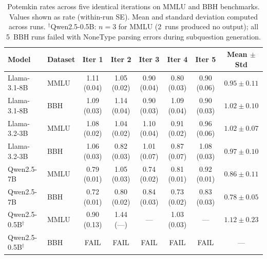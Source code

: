 \documentclass[sigconf,authordraft]{acmart}
\begin{document}
\begin{table}[t]
\centering
\small
\setlength{\tabcolsep}{5pt}
\renewcommand{\arraystretch}{1.2}

\begin{tabular}{ll ccccc c}
\toprule
\textbf{Model} & \textbf{Dataset} & \textbf{Iter 1} & \textbf{Iter 2} & \textbf{Iter 3} & \textbf{Iter 4} & \textbf{Iter 5} & \textbf{Mean $\pm$ Std} \\
\midrule

Llama-3.1-8B & MMLU
& 1.11 (0.04) & 1.05 (0.02) & 0.90 (0.04) & 0.80 (0.03) & 0.90 (0.06) & $0.95 \pm 0.11$ \\

Llama-3.1-8B & BBH
& 1.09 (0.03) & 1.14 (0.04) & 0.90 (0.03) & 1.09 (0.04) & 0.90 (0.03) & $1.02 \pm 0.10$ \\

\rowcolor{gray!10}
Llama-3.2-3B & MMLU
& 1.08 (0.02) & 1.04 (0.02) & 1.10 (0.04) & 0.91 (0.02) & 0.96 (0.06) & $1.02 \pm 0.07$ \\

\rowcolor{gray!10}
Llama-3.2-3B & BBH
& 1.06 (0.03) & 0.82 (0.03) & 1.01 (0.07) & 0.87 (0.07) & 1.08 (0.03) & $0.97 \pm 0.10$ \\

Qwen2.5-7B & MMLU
& 0.79 (0.01) & 1.05 (0.03) & 0.74 (0.02) & 0.81 (0.01) & 0.92 (0.01) & $0.86 \pm 0.11$ \\

Qwen2.5-7B & BBH
& 0.72 (0.01) & 0.80 (0.02) & 0.84 (0.03) & 0.73 (0.02) & 0.83 (0.03) & $0.78 \pm 0.05$ \\

\rowcolor{gray!10}
Qwen2.5-0.5B$^\dagger$ & MMLU
& 0.90 (0.13) & 1.44 (---) & --- & 1.03 (0.03) & --- & $1.12 \pm 0.23$ \\

\rowcolor{gray!10}
Qwen2.5-0.5B$^\dagger$ & BBH
& FAIL & FAIL & FAIL & FAIL & FAIL & --- \\

\bottomrule
\end{tabular}

\caption{Potemkin rates across five identical iterations on MMLU and BBH benchmarks. Values shown as rate (within-run SE). Mean and standard deviation computed across runs. $^\dagger$Qwen2.5-0.5B: $n{=}3$ for MMLU (2~runs produced no output); all 5~BBH runs failed with NoneType parsing errors during subquestion generation.}
\label{tab:iteration_results}

\end{table}
\end{document}

